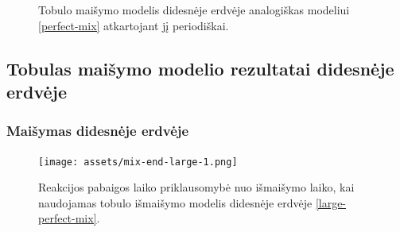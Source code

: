 \documentclass{beamer}
\begin{document}
\begin{frame}
\begin{figure}
    \caption{Tobulo maišymo modelis didesnėje erdvėje analogiškas modeliui \eqref{perfect-mix} atkartojant jį periodiškai.}
    \label{large-perfect-mix}
\end{figure}
\end{frame}

\subsection{Tobulas maišymo modelio rezultatai didesnėje erdvėje}
\begin{frame}
    \frametitle{Maišymas didesnėje erdvėje}
    \begin{figure}
    \centering
    \texttt{[image: assets/mix-end-large-1.png]}
    \caption{Reakcijos pabaigos laiko priklausomybė nuo išmaišymo laiko, kai naudojamas tobulo išmaišymo modelis didesnėje erdvėje \eqref{large-perfect-mix}.}
    \end{figure}
\end{frame}

\end{document}
